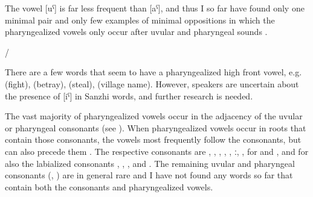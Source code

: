 The vowel [uˁ] is far less frequent than [aˁ], and thus I so far have found only one minimal pair and only few examples of minimal oppositions in which the pharyngealized vowels only occur after uvular and pharyngeal sounds .
%
\begin{exe}
	\ex	\label{ex:pharyngealization minimal pairs B phon@A}
	\begin{xlist}
	\TabPositions{15em}
		\ex	{}\slash{}  \tab {} 
		\ex	{}  \tab {} 
		\ex	{} 		\tab {} 
		\ex	{} 		\tab {} 
	\end{xlist}
\end{exe}

There are a few words that seem to have a pharyngealized high front vowel, e.g.   (fight),   (betray),  (steal),  (village name). However, speakers are uncertain about the presence of [iˁ] in Sanzhi words, and further research is needed.

The vast majority of pharyngealized vowels occur in the adjacency of the uvular or pharyngeal consonants (see ). When pharyngealized vowels occur in roots that contain those consonants, the vowels most frequently follow the consonants, but can also precede them . The respective consonants are , , , , , ː, ,  for  and , and for  also the labialized consonants , , , and . The remaining uvular and pharyngeal consonants (, ) are in general rare and I have not found any words so far that contain both the consonants and pharyngealized vowels.
%
\begin{exe}
	\ex	\label{ex:uvular pharyngealphon1}
\TabPositions{12em}
 	\tab {} 	\\
 	\tab {} 	\\
 	\tab {} 	\\
 	
\end{exe}

